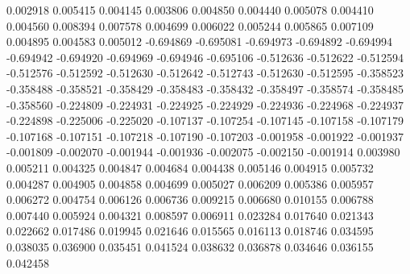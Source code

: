 0.002918
0.005415
0.004145
0.003806
0.004850
0.004440
0.005078
0.004410
0.004560
0.008394
0.007578
0.004699
0.006022
0.005244
0.005865
0.007109
0.004895
0.004583
0.005012
-0.694869
-0.695081
-0.694973
-0.694892
-0.694994
-0.694942
-0.694920
-0.694969
-0.694946
-0.695106
-0.512636
-0.512622
-0.512594
-0.512576
-0.512592
-0.512630
-0.512642
-0.512743
-0.512630
-0.512595
-0.358523
-0.358488
-0.358521
-0.358429
-0.358483
-0.358432
-0.358497
-0.358574
-0.358485
-0.358560
-0.224809
-0.224931
-0.224925
-0.224929
-0.224936
-0.224968
-0.224937
-0.224898
-0.225006
-0.225020
-0.107137
-0.107254
-0.107145
-0.107158
-0.107179
-0.107168
-0.107151
-0.107218
-0.107190
-0.107203
-0.001958
-0.001922
-0.001937
-0.001809
-0.002070
-0.001944
-0.001936
-0.002075
-0.002150
-0.001914
0.003980
0.005211
0.004325
0.004847
0.004684
0.004438
0.005146
0.004915
0.005732
0.004287
0.004905
0.004858
0.004699
0.005027
0.006209
0.005386
0.005957
0.006272
0.004754
0.006126
0.006736
0.009215
0.006680
0.010155
0.006788
0.007440
0.005924
0.004321
0.008597
0.006911
0.023284
0.017640
0.021343
0.022662
0.017486
0.019945
0.021646
0.015565
0.016113
0.018746
0.034595
0.038035
0.036900
0.035451
0.041524
0.038632
0.036878
0.034646
0.036155
0.042458
